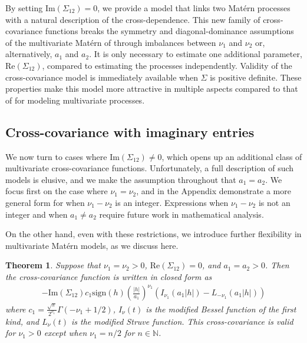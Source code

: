 \documentclass[11pt]{article}
\newtheorem{theorem}{Theorem}
\begin{document}
By setting $\textrm{Im}(\Sigma_{12}) = 0$, we provide a model that links two Mat\'ern processes with a natural description of the cross-dependence. 
This new family of cross-covariance functions breaks the symmetry and diagonal-dominance assumptions of the multivariate Mat\'ern of \cite{gneiting_matern_2010} through imbalances between $\nu_1$ and $\nu_2$ or, alternatively, $a_1$ and $a_2$.
It is only necessary to estimate one additional parameter, $\textrm{Re}(\Sigma_{12})$, compared to estimating the processes independently. 
Validity of the cross-covariance model is immediately available when $\Sigma$ is positive definite. 
These properties make this model more attractive in multiple aspects compared to that of \cite{gneiting_matern_2010} for modeling multivariate processes. 

\subsection{Cross-covariance with imaginary entries}\label{sec:im_ent}

We now turn to cases where $\textrm{Im}(\Sigma_{12})\neq 0$, which opens up an additional class of multivariate cross-covariance functions. 
Unfortunately, a full description of such models is elusive, and we make the assumption throughout that $a_1 = a_2$. 
We focus first on the case where $\nu_1 = \nu_2$, and in the Appendix demonstrate a more general form for when $\nu_1 - \nu_2$ is an integer. 
Expressions when $\nu_1 - \nu_2$ is not an integer and when $a_1 \neq a_2$ require future work in mathematical analysis.

On the other hand, even with these restrictions, we introduce further flexibility in multivariate Mat\'ern models, as we discuss here. 

\begin{theorem}\label{thm:im_ent}
Suppose that $\nu_1 = \nu_2 > 0$, $\textrm{Re}(\Sigma_{12}) = 0$, and $a_1 = a_2 > 0$. Then the cross-covariance function is written in closed form as \begin{align*}
-\textrm{Im}(\Sigma_{12})c_1\textrm{sign}(h)\left(\frac{|h|}{a_1}\right)^{\nu_1} \left(I_{\nu_1}(a_1|h|) - L_{-\nu_1}(a_1|h|)\right) 
\end{align*}where
$c_1 =  \frac{\sqrt{\pi}}{2^{\nu_1}}\Gamma(-\nu_1 + 1/2)$, 
$I_\nu(t)$ is the modified Bessel function of the first kind, and 
$L_\nu(t)$ is the modified Struve function. This cross-covariance is valid for $\nu_1 > 0$ except when $\nu_1 = n/2$ for $n \in \mathbb{N}$.

\end{theorem}
\end{document}
